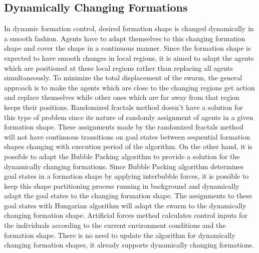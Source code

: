 \subsection{Dynamically Changing Formations} \label{dynamical_ref}
In dynamic formation control, desired formation shape is changed dynamically in a smooth fashion. Agents have to adapt themselves to this changing formation shape and cover the shape in a continuous manner. Since the formation shape is expected to have smooth changes in local regions, it is aimed to adapt the agents which are positioned at these local regions rather than replacing all agents simultaneously. To minimize the total displacement of the swarm, the general approach is to make the agents which are close to the changing regions get action and replace themselves while other ones which are far away from that region keeps their positions. Randomized fractals method doesn't have a solution for this type of problem since its nature of randomly assignment of agents in a given formation shape. These assignments made by the randomized fractals method will not have continuous transitions on goal states between sequential formation shapes changing with execution period of the algorithm. On the other hand, it is possible to adapt the Bubble Packing algorithm to provide a solution for the dynamically changing formations. Since Bubble Packing algorithm determines goal states in a formation shape by applying interbubble forces, it is possible to keep this shape partitioning process running in background and dynamically adapt the goal states to the changing formation shape. The assignments to these goal states with Hungarian algorithm will adapt the swarm to the dynamically changing formation shape. Artificial forces method calculates control inputs for the individuals according to the current environment conditions and the formation shape. There is no need to update the algorithm for dynamically changing formation shapes, it already supports dynamically changing formations. 
		 
